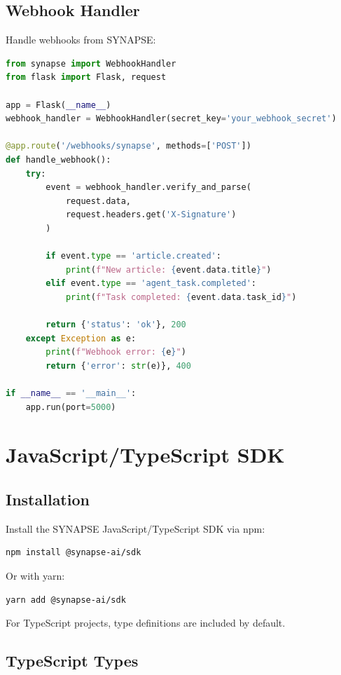 \documentclass{report}
\begin{document}
\section{Webhook Handler}

Handle webhooks from SYNAPSE:

\begin{lstlisting}[language=Python]
from synapse import WebhookHandler
from flask import Flask, request

app = Flask(__name__)
webhook_handler = WebhookHandler(secret_key='your_webhook_secret')

@app.route('/webhooks/synapse', methods=['POST'])
def handle_webhook():
    try:
        event = webhook_handler.verify_and_parse(
            request.data,
            request.headers.get('X-Signature')
        )
        
        if event.type == 'article.created':
            print(f"New article: {event.data.title}")
        elif event.type == 'agent_task.completed':
            print(f"Task completed: {event.data.task_id}")
        
        return {'status': 'ok'}, 200
    except Exception as e:
        print(f"Webhook error: {e}")
        return {'error': str(e)}, 400

if __name__ == '__main__':
    app.run(port=5000)
\end{lstlisting}

\chapter{JavaScript/TypeScript SDK}

\section{Installation}

Install the SYNAPSE JavaScript/TypeScript SDK via npm:

\begin{lstlisting}[language=bash]
npm install @synapse-ai/sdk
\end{lstlisting}

Or with yarn:

\begin{lstlisting}[language=bash]
yarn add @synapse-ai/sdk
\end{lstlisting}

For TypeScript projects, type definitions are included by default.

\section{TypeScript Types}
\end{document}
